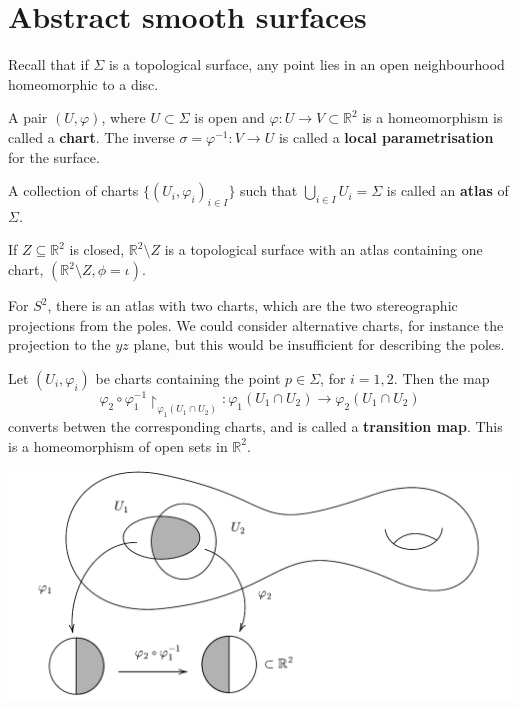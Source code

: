 \documentclass[a4paper]{article}
\begin{document}
\section{Abstract smooth surfaces}
Recall that if \( \Sigma \) is a topological surface, any point lies in an open neighbourhood homeomorphic to a disc.
\begin{definition}
	A pair \( (U, \varphi) \), where $ U \subset \Sigma $ is open and $ \varphi:U\to V \subset \mathbb{R}^{2} $ is a homeomorphism is called a \textbf{chart}. The inverse \( \sigma = \varphi^{-1} \colon V \to U \) is called a \textbf{local parametrisation} for the surface.
\end{definition}

\begin{definition}
	A collection of charts $ \{(U_i,\varphi_i)_{i\in I}\} $ such that $ \bigcup_{i\in I} U_i = \Sigma $ is called an \textbf{atlas} of $\Sigma$. 
\end{definition}
\begin{example}
	If \( Z \subseteq \mathbb R^2 \) is closed, \( \mathbb R^2 \setminus Z \) is a topological surface with an atlas containing one chart, \( (\mathbb R^2 \setminus Z, \phi = \iota) \).

	For \( S^2 \), there is an atlas with two charts, which are the two stereographic projections from the poles.
	We could consider alternative charts, for instance the projection to the \( yz \) plane, but this would be insufficient for describing the poles.
\end{example}
\begin{definition}
	Let \( (U_i, \varphi_i) \) be charts containing the point \( p \in \Sigma \), for \( i = 1, 2 \).
	Then the map
	\[
		\varphi_2 \circ\varphi_1^{-1}\restriction_{\varphi_1(U_1 \cap U_2)} \colon \varphi_1(U_1 \cap U_2) \to \varphi_2(U_1 \cap U_2)
	\]
	converts betwen the corresponding charts, and is called a \textbf{transition map}.
	This is a homeomorphism of open sets in \( \mathbb R^2 \).
\end{definition}

\begin{center}
\includegraphics[scale=.7]{Geo1}
\end{center}
\end{document}
